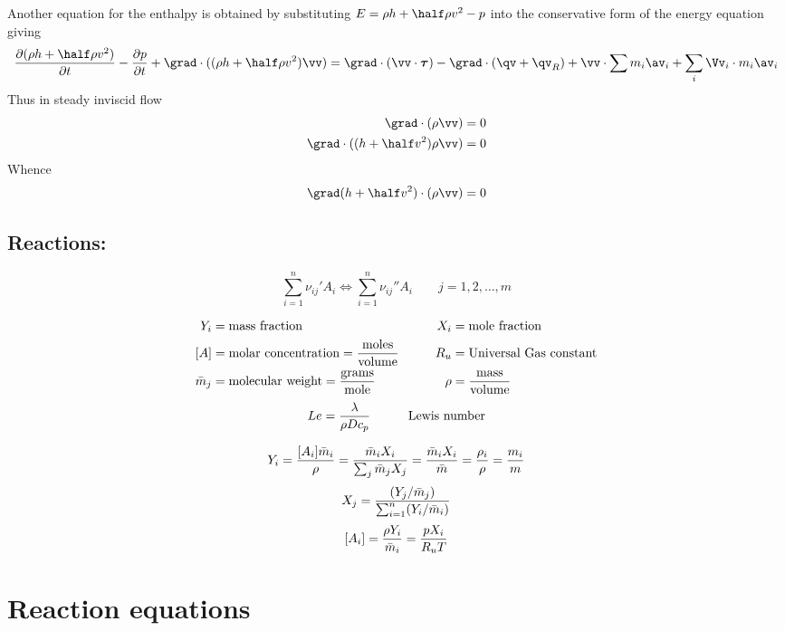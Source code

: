 \documentclass{article}
\begin{document}
Another equation for the enthalpy is obtained by substituting $E=\rho h+\half\rho v^2-p$ into the conservative
form of the energy equation giving
\[
    {\partial( \rho h+\half\rho v^2 ) \over \partial t} - {\partial p \over \partial t}
 + \grad\cdot( (\rho h+\half\rho v^2)\vv ) =
              \grad\cdot( \vv\cdot\tauv )
            - \grad\cdot(\qv+\qv_R) + \vv\cdot\sum m_i\av_i + \sum_i \Vv_i\cdot m_i \av_i 
\]
Thus in steady inviscid flow 
\begin{align*}
   \grad\cdot(\rho\vv) &=0 \\
   \grad\cdot( (h+\half v^2)\rho \vv ) &=0
\end{align*}
Whence
\[
   \grad(h+\half v^2)\cdot(\rho\vv) =0
\]

\subsection{Reactions:}
\[
    \sum_{i=1}^n \nu_{ij}' A_i \Leftrightarrow \sum_{i=1}^n \nu_{ij}''A_i  \qquad j=1,2,\ldots,m
\]


\begin{alignat}{3}
   Y_i &= \mbox{mass fraction} &\qquad 
      X_i &= \mbox{mole fraction} \\
        [A] &= \mbox{molar concentration} = {\mbox{moles}\over\mbox{volume}}  &\quad R_u&=\mbox{Universal Gas constant} \\
  \bar{m}_j &= \mbox{molecular weight} = {\mbox{grams}\over\mbox{mole}} &\qquad 
   \rho &= {\mbox{mass}\over\mbox{volume}}
\end{alignat}
\begin{alignat}{2}
   Le &= {\lambda\over \rho D c_p} & \qquad\mbox{Lewis number} 
\end{alignat}


\[
    Y_i = { [A_i] \bar{m}_i \over \rho } = {\bar{m}_i X_i \over \sum_j \bar{m}_j X_j} = {\bar{m}_i X_i \over \bar{m}}
    = { \rho_i \over \rho} = { m_i \over m}
\]
\[
    X_j = { (Y_j /\bar{m}_j) \over \sum_{i=1}^n (Y_i / \bar{m}_i) }
\]
\[
    [A_i] = {\rho Y_i \over \bar{m}_i} = {p X_i \over R_u T}
\]


\section{Reaction equations}
\end{document}
